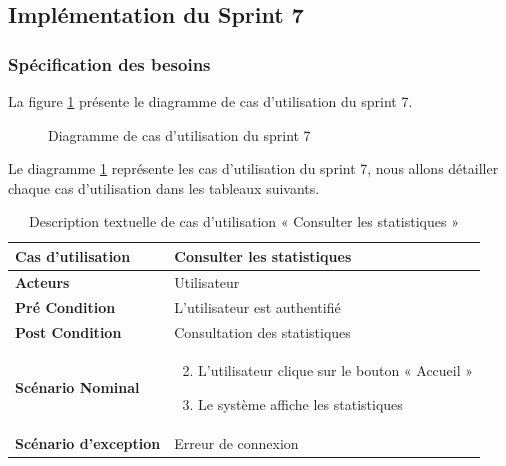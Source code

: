 \subsection{Implémentation du Sprint 7}

\subsubsection{Spécification des besoins}
La figure \ref{fig:UseCaseDiagramSp71} présente le diagramme de cas d'utilisation du sprint 7.

\begin{figure}[H]
  \centering
  \caption{Diagramme de cas d'utilisation du sprint 7}
  \label{fig:UseCaseDiagramSp71}
\end{figure}

Le diagramme \ref{fig:UseCaseDiagramSp71} représente les cas d'utilisation du sprint 7, nous allons détailler chaque cas d'utilisation dans les tableaux suivants.


\begin{longtable}{|p{5cm}|p{10cm}|}
  \caption{Description textuelle de cas d'utilisation « Consulter les statistiques »} \label{tab:use_case_consulter_statistiques} \\
\hline
\textbf{Cas d'utilisation}&Consulter les statistiques\\
\hline
\textbf{Acteurs}&Utilisateur\\
\hline
\textbf{Pré Condition}&L'utilisateur est authentifié\\
\hline
\textbf{Post Condition}&Consultation des statistiques\\
\hline
\textbf{Scénario Nominal}&
\vspace{-\baselineskip}
\begin{enumerate}
  \setcounter{enumi}{1}
      \item L'utilisateur clique sur le bouton « Accueil »
      \item  Le système affiche les statistiques
\end{enumerate}\\
\hline
\textbf{Scénario d'exception}&Erreur de connexion\\
\hline

\end{longtable}

